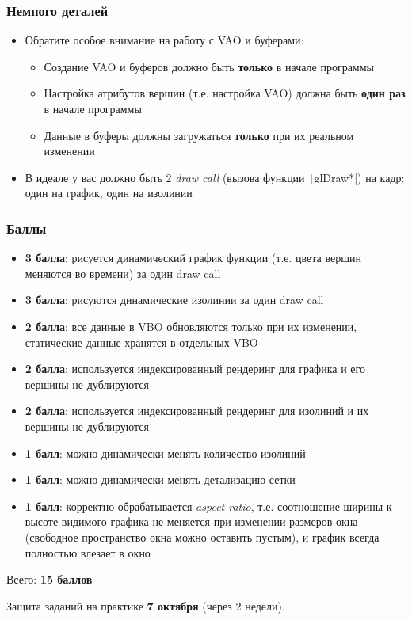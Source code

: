 \documentclass[10pt]{beamer}
\begin{document}
\begin{frame}[fragile]
\frametitle{Немного деталей}
\begin{itemize}
\item Обратите особое внимание на работу с VAO и буферами:
\begin{itemize}
\item Создание VAO и буферов должно быть \textbf{только} в начале программы
\item Настройка атрибутов вершин (т.е. настройка VAO) должна быть \textbf{один раз} в начале программы
\item Данные в буферы должны загружаться \textbf{только} при их реальном изменении
\end{itemize}
\pause
\item В идеале у вас должно быть 2 \textit{draw call} (вызова функции \texttt|glDraw*|) на кадр: один на график, один на изолинии
\end{itemize}
\end{frame}

\begin{frame}[fragile]
\frametitle{Баллы}
\footnotesize
\begin{itemize}
\item \textbf{3 балла}: рисуется динамический график функции (т.е. цвета вершин меняются во времени) за один draw call
\item \textbf{3 балла}: рисуются динамические изолинии за один draw call
\item \textbf{2 балла}: все данные в VBO обновляются только при их изменении, статические данные хранятся в отдельных VBO
\item \textbf{2 балла}: используется индексированный рендеринг для графика и его вершины не дублируются
\item \textbf{2 балла}: используется индексированный рендеринг для изолиний и их вершины не дублируются
\item \textbf{1 балл}:  можно динамически менять количество изолиний
\item \textbf{1 балл}:  можно динамически менять детализацию сетки
\item \textbf{1 балл}:  корректно обрабатывается \textit{aspect ratio}, т.е. соотношение ширины к высоте видимого графика не меняется при изменении размеров окна (свободное пространство окна можно оставить пустым), и график всегда полностью влезает в окно
\end{itemize}
Всего: \textbf{15 баллов}

Защита заданий на практике \textbf{7 октября} (через 2 недели).
\end{frame}
\end{document}
